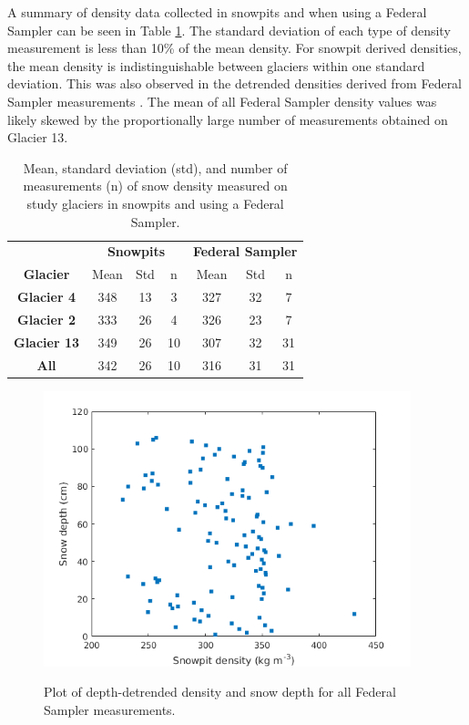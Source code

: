 \documentclass[12pt]{article}
\begin{document}
A summary of density data collected in snowpits and when using a Federal Sampler can be seen in Table \ref{tab:density_stats}. The standard deviation of each type of density measurement is less than 10\% of the mean density. For snowpit derived densities, the mean density is indistinguishable between glaciers within one standard deviation. This was also observed in the detrended densities derived from Federal Sampler measurements . The mean of all Federal Sampler density values was likely skewed by the proportionally large number of measurements obtained on Glacier 13.

\begin{table}[b!]
\centering
\caption{Mean, standard deviation (std), and number of measurements (n) of snow density measured on study glaciers in snowpits and using a Federal Sampler. }
\label{tab:density_stats}
\begin{tabular}{ccccccc}
 & \multicolumn{3}{c}{\textbf{Snowpits}} & \multicolumn{3}{c}{\textbf{Federal Sampler}} \\
\multirow{-2}{*}{\textbf{Glacier}} & Mean & Std & n & Mean & Std & n \\ \hline
\textbf{Glacier 4} & 348 & 13 & 3 & 327 & 32 & 7 \\
\textbf{Glacier 2} & 333 & 26 & 4 & 326 & 23 & 7 \\
\textbf{Glacier 13} & 349 & 26 & 10 & 307 & 32 & 31 \\
\rowcolor[HTML]{EFEFEF} 
\textbf{All} & 342 & 26 & 10 & 316 & 31 & 31
\end{tabular}
\end{table}

\begin{figure}[H]%
	\centering
	\includegraphics[width =0.95\textwidth]{DepthDensity_tubeDETREND.png}\\
	\caption{Plot of depth-detrended density and snow depth for all Federal Sampler measurements.}
	\label{fig:tube_depthDETREND}
\end{figure}
\end{document}
